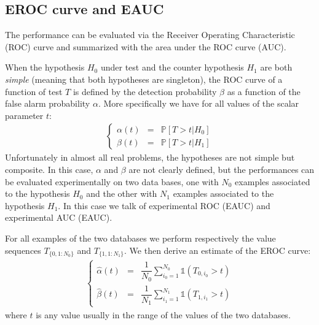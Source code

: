 \documentclass[graybox]{svmult/styles/svmult}
\def\hat{\widehat}
\newcommand{\prob}[1]{\mathds{P}\left[ #1 \right]}
\begin{document}
\subsection{EROC curve and EAUC}
The performance can be evaluated via the Receiver Operating Characteristic (ROC) curve and summarized with the  area under the ROC curve (AUC).  

When the hypothesis $H_{0}$ under test and the  counter hypothesis $H_{1}$ are both \emph{simple} (meaning that both hypotheses are singleton), the ROC curve of a function of test $T$ is defined by the detection probability $\beta$ as a function of the false alarm probability $\alpha$. More specifically we have for all values of the scalar parameter $t$:
\begin{eqnarray*}
\left\{
\begin{array}{rcl}
\alpha(t)&=&\prob{T>t|H_{0}}
\\
\beta(t)&=&\prob{T>t|H_{1}}
\end{array} \right.
\end{eqnarray*}
Unfortunately in almost all real problems, the hypotheses are not simple but composite. In this case, $\alpha$ and $\beta$ are not clearly defined, but the performances can be evaluated experimentally on two data bases, one with $N_{0}$ examples associated to the hypothesis $H_{0}$ and the other with $N_{1}$ examples associated to the hypothesis  $H_{1}$. In this case we talk of experimental ROC (EAUC) and experimental AUC (EAUC).

For all examples of the two databases we perform respectively the value sequences $T_{\{0,1:N_{0}\}}$ and $T_{\{1,1:N_{1}\}}$. We then derive an estimate of the EROC curve:
\begin{eqnarray*}
\left\{
\begin{array}{rcl}
 \hat\alpha(t)&=&\dfrac{1}{N_{0}}\sum_{i_{0}=1}^{N_{0}}\mathds{1}(T_{0,i_{0}}>t)
\\
 \hat\beta(t)&=&\dfrac{1}{N_{1}}\sum_{i_{1}=1}^{N_{1}}\mathds{1}(T_{1,i_{1}}>t)
\end{array}
\right.
\end{eqnarray*}
where $t$ is any value usually in the range of the values of the two databases. 
\end{document}
